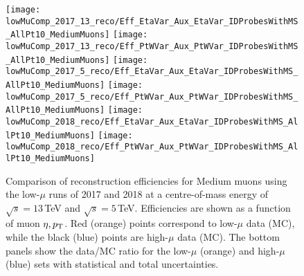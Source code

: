 	\begin{figure}
		\centering
		\texttt{[image: lowMuComp\_2017\_13\_reco/Eff\_EtaVar\_Aux\_EtaVar\_IDProbesWithMS\_AllPt10\_MediumMuons]}%
		\texttt{[image: lowMuComp\_2017\_13\_reco/Eff\_PtWVar\_Aux\_PtWVar\_IDProbesWithMS\_AllPt10\_MediumMuons]}
		\texttt{[image: lowMuComp\_2017\_5\_reco/Eff\_EtaVar\_Aux\_EtaVar\_IDProbesWithMS\_AllPt10\_MediumMuons]}%
	\texttt{[image: lowMuComp\_2017\_5\_reco/Eff\_PtWVar\_Aux\_PtWVar\_IDProbesWithMS\_AllPt10\_MediumMuons]}
		\texttt{[image: lowMuComp\_2018\_reco/Eff\_EtaVar\_Aux\_EtaVar\_IDProbesWithMS\_AllPt10\_MediumMuons]}%
	\texttt{[image: lowMuComp\_2018\_reco/Eff\_PtWVar\_Aux\_PtWVar\_IDProbesWithMS\_AllPt10\_MediumMuons]}
	
		\caption{Comparison of reconstruction efficiencies for Medium muons
			using the low-$\mu$ runs of 2017 and 2018 at a centre-of-mass energy of
			$\sqrt{s}=13\,$TeV and $\sqrt{s}=5\,$TeV. Efficiencies are
			shown as a function of muon $\eta, p_{\text{T}}$. Red (orange) points correspond to low-$\mu$ data (MC),
			while the black (blue) points are high-$\mu$ data (MC). The bottom
			panels show the data/MC ratio for the low-$\mu$ (orange) and
			high-$\mu$ (blue) sets with statistical and total
			uncertainties.}\label{app:fig:lowMu2}
	\end{figure}
	
